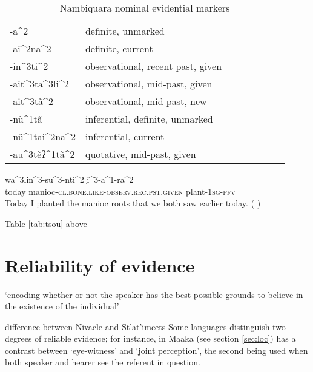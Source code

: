 \documentclass[oneside,a4paper,11pt]{article}
\newcommand{\ipa}[1]{{\phon \mbox{#1}}} %
\begin{document}
 \begin{table}
 \caption{Nambiquara nominal evidential markers} \centering
\begin{tabular}{llllllll}
\ipa{-a^2} & definite, unmarked \\
\ipa{-ai^2na^2} & definite, current \\
\ipa{-in^3ti^2} & observational, recent past, given \\
\ipa{-ait^3ta^3li^2} & observational, mid-past, given \\
\ipa{-ait^3tã^2} & observational, mid-past, new \\
\ipa{-nũ^1tã} & inferential, definite, unmarked \\
\ipa{-nũ^1tai^2na^2} & inferential, current \\
\ipa{-au^3tẽʔ^1tã^2} & quotative, mid-past, given \\
\end{tabular}
\end{table}

 \begin{exe}
\ex
\gll  \ipa{hĩ^1na^2su^2} \ipa{wa^3lin^3-su^3-nti^2} \ipa{ḭ̃^3-a^1-ra^2} \\
today manioc-\textsc{cl.bone.like-observ.rec.pst.given} plant-\textsc{1sg-pfv} \\
\glt Today I planted the manioc roots that we both saw earlier today. (\citealt[290, ex 62.]{lowe99nambiquara} ) 
  \end{exe}
 
 \citet[54]{yang00tsou.case}
 Table \ref{tab:tsou} above 
 

 
\section{Reliability of evidence} \label{sec:reliability}


 


 \citet[193]{eijk97lillooet}
 
\citet{gutierrez11evidentiality}
\citet{matthewson07epistemic}
\citet{gutierrez12determiners}

 \citet{gutierrez11evidentiality} `encoding whether or not the speaker has the best possible grounds to believe in the existence of the individual' 
 
 difference between Nivacle and St'at'imcets
 Some languages distinguish two degrees of reliable evidence; for instance, in Maaka (see section \ref{sec:loc}) has a contrast between `eye-witness' and `joint perception', the second being used when both speaker and hearer see the referent in question. 
 
\end{document}
